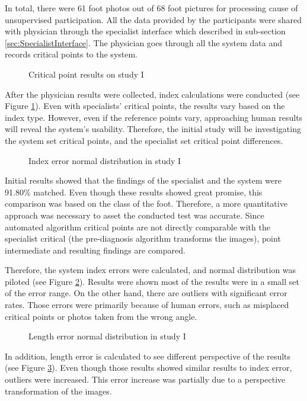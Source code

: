 In total, there were 61 foot photos out of 68 foot pictures for processing cause of unsupervised participation. All the data provided by the participants were shared with physician through the specialist interface which described in sub-section \ref{sec:SpecialistInterface}. The physician goes through all the system data and records critical points to the system.

\begin{figure}[htbp]
\centering
{}
\caption{Critical point results on study I}
\label{fig:StudyICriticalPointResult}
\end{figure}

After the physician results were collected, index calculations were conducted (see Figure  \ref{fig:StudyICriticalPointResult}). Even with specialists' critical points, the results vary based on the index type. However, even if the reference points vary, approaching human results will reveal the system's usability. Therefore, the initial study will be investigating the system set critical points, and the specialist set critical point differences.

\begin{figure}[htbp]
\centering
{}
\caption{Index error normal distribution in study I}
\label{fig:StudyIIndexErrorNormalDists}
\end{figure}

Initial results showed that the findings of the specialist and the system were 91.80\% matched. Even though these results showed great promise, this comparison was based on the class of the foot. Therefore, a more quantitative approach was necessary to asset the conducted test was accurate. Since automated algorithm critical points are not directly comparable with the specialist critical (the pre-diagnosis algorithm transforms the images), point intermediate and resulting findings are compared.

Therefore, the system index errors were calculated, and normal distribution was piloted (see Figure \ref{fig:StudyIIndexErrorNormalDists}). Results were shown most of the results were in a small set of the error range. On the other hand, there are outliers with significant error rates. Those errors were primarily because of human errors, such as misplaced critical points or photos taken from the wrong angle. 

\begin{figure}[htbp]
\centering
{}
\caption{Length error normal distribution in study I}
\label{fig:StudyILenghtErrorNormalDists}
\end{figure}

In addition, length error is calculated to see different perspective of the results (see Figure \ref{fig:StudyILenghtErrorNormalDists}). Even though those results showed similar results to index error, outliers were increased. This error increase was partially due to a perspective transformation of the images.
